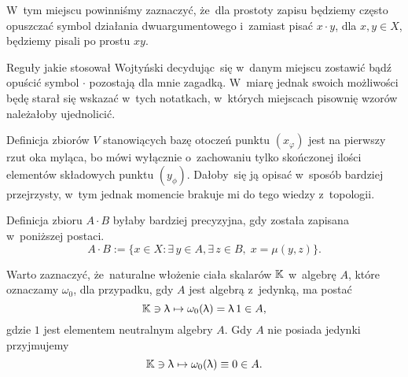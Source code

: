 \documentclass[a4paper,11pt]{article}
\numberwithin{equation}{section}
\renewcommand{\lambda}{\uplambda}
\begin{document}
\VerSpaceFour






\vspace{0em}


\noindent
{} W~tym miejscu powinniśmy zaznaczyć, że~dla prostoty zapisu
będziemy często opuszczać symbol działania dwuargumentowego i~zamiast pisać
$x \cdot y$, dla $x, y \in X$, będziemy pisali po prostu $x y$.

Reguły jakie stosował Wojtyński decydując~się w~danym miejscu zostawić bądź
opuścić symbol $\cdot$ pozostają dla mnie zagadką. W~miarę jednak swoich
możliwości będę starał się wskazać w~tych notatkach, w~których miejscach
pisownię wzorów należałoby ujednolicić.

\VerSpaceFour





\noindent
{} Definicja zbiorów $V$ stanowiących bazę otoczeń punktu
$( x_{ \varphi } )$ jest na pierwszy rzut oka myląca, bo mówi wyłącznie
o~zachowaniu tylko skończonej ilości elementów składowych punktu
$( y_{ \phi } )$. Dałoby~się ją opisać w~sposób bardziej przejrzysty, w~tym
jednak momencie brakuje mi do tego wiedzy z~topologii.

\VerSpaceFour





\noindent
{} Definicja zbioru $A \cdot B$ byłaby bardziej precyzyjna, gdy
została zapisana w~poniższej postaci.
\begin{equation}
  \label{eq:Wojtynski-GrupyETC-01}
  A \cdot B := \{ x \in X : \exists\, y \in A, \exists\, z \in B,\; x = \mu( y, z ) \}.
\end{equation}

\VerSpaceFour





\noindent
{} Warto zaznaczyć, że~naturalne włożenie ciała skalarów
$\mathbb{K}$ w~algebrę $A$, które oznaczamy $\omega_{ 0 }$, dla przypadku, gdy $A$ jest
algebrą z~jedynką, ma postać
\begin{equation}
  \label{eq:Wojtynski-02}
  \Kbb \ni \lambda \mapsto \omega_{ 0 }( \lambda ) = \lambda \, 1 \in A,
\end{equation}
gdzie $1$ jest elementem neutralnym algebry $A$. Gdy $A$ nie posiada jedynki
przyjmujemy
\begin{equation}
  \label{eq:Wojtynski-03}
  \Kbb \ni \lambda \mapsto \omega_{ 0 }( \lambda ) \equiv 0 \in A.
\end{equation}
\end{document}
